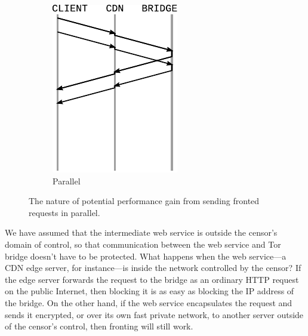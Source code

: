 \documentclass[conference]{IEEEtran}
\begin{document}
\begin{figure}
\begin{subfigure}[t]{0.40\linewidth}
\includegraphics[width=\linewidth]{wire-parallel}
\caption{Parallel}
\label{fig:wire-parallel}
\end{subfigure}

\caption{
The nature of potential performance gain
from sending fronted requests in parallel.
}
\label{fig:wire}
\end{figure}

We have assumed that the intermediate web service is
outside the censor's domain of control,
so that communication between the web service and Tor bridge
doesn't have to be protected.
What happens when the web service---a CDN edge server, for instance---is
inside the network controlled by the censor?
If the edge server forwards the request to the bridge
as an ordinary HTTP request on the public Internet,
then blocking it is as easy as blocking the IP address of the bridge.
On the other hand, if the web service encapsulates
the request and sends it encrypted, or over its own fast private network,
to another server outside of the censor's control,
then fronting will still work.
\end{document}
